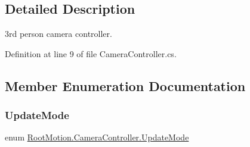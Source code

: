 \subsection{Detailed Description}
3rd person camera controller. 



Definition at line 9 of file Camera\+Controller.\+cs.



\subsection{Member Enumeration Documentation}
\mbox{\label{class_root_motion_1_1_camera_controller_ae662cdbe3ccf669cdb38fad428386edb}} 
\subsubsection{\texorpdfstring{Update\+Mode}{UpdateMode}}
{\footnotesize\ttfamily enum \mbox{\hyperlink{class_root_motion_1_1_camera_controller_ae662cdbe3ccf669cdb38fad428386edb}{Root\+Motion.\+Camera\+Controller.\+Update\+Mode}}\hspace{0.3cm}{\ttfamily [strong]}}

